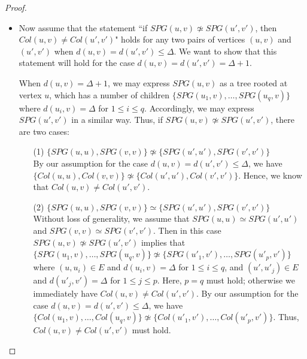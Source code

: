 \begin{proof}
\begin{itemize}
\item Now assume that the statement ``if $SPG(u,v)\not\simeq SPG(u',v')$, then $Col(u,v)\neq Col(u',v')$" holds for any two pairs of vertices $(u,v)$ and $(u',v')$ when $d(u,v)=d(u',v')\leq \Delta$. We want to show that this statement will hold for the case $d(u,v)=d(u',v')= \Delta+1$.

When $d(u,v)=\Delta+1$, we may express $SPG(u,v)$ as a tree rooted at vertex $u$, which has a number of children $\{SPG(u_1,v),\dots, SPG(u_q,v)\}$ where $d(u_i,v)=\Delta$ for $1\leq i\leq q$. Accordingly, we may express $SPG(u',v')$ in a similar way. Thus, if $SPG(u,v)\not\simeq SPG(u',v')$, there are two cases:
\begin{itemize}
    \item[(1)] $\{SPG(u,u),SPG(v,v)\}\not\simeq \{SPG(u',u'),SPG(v',v')\}$ \\By our assumption for the case $d(u,v)=d(u',v')\leq \Delta$, we have $\{Col(u,u),Col(v,v)\}\not\simeq \{Col(u',u'),Col(v',v')\}$. Hence, we know that $Col(u,v)\neq Col(u',v')$.
    \item[(2)] $\{SPG(u,u), SPG(v,v)\}\simeq \{SPG(u',u'),SPG(v',v')\}$\\ Without loss of generality, we assume that $SPG(u,u)\simeq SPG(u',u')$ and $SPG(v,v)\simeq SPG(v',v')$. Then in this case $SPG(u,v)\not\simeq SPG(u',v')$ implies that $\{SPG(u_1,v),\dots, SPG(u_q,v)\}\not\simeq \{SPG(u'_1,v'),\dots, SPG(u'_p,v')\}$ where $(u,u_i)\in E$ and $d(u_i,v)=\Delta$ for $1\leq i\leq q$, and $(u',u'_j)\in E$ and $d(u'_j,v')=\Delta$ for $1\leq j\leq p$. Here, $p=q$ must hold; otherwise we immediately have $Col(u,v)\neq Col(u',v')$. By our assumption for the case $d(u,v)=d(u',v')\leq \Delta$, we have $\{Col(u_1,v),\dots, Col(u_q,v)\}\not\simeq \{Col(u'_1,v'),\dots, Col(u'_p,v')\}$. Thus, $Col(u,v)\neq Col(u',v')$ must hold.
\end{itemize}
\end{itemize}
\end{proof}

